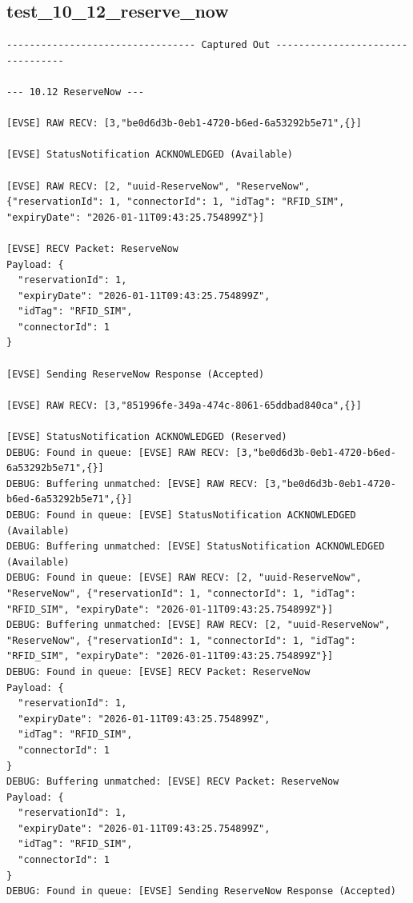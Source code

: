 \documentclass{article}
\begin{document}
\subsection*{test\_10\_12\_reserve\_now}
\begin{lstlisting}
--------------------------------- Captured Out ---------------------------------

--- 10.12 ReserveNow ---

[EVSE] RAW RECV: [3,"be0d6d3b-0eb1-4720-b6ed-6a53292b5e71",{}]

[EVSE] StatusNotification ACKNOWLEDGED (Available)

[EVSE] RAW RECV: [2, "uuid-ReserveNow", "ReserveNow", {"reservationId": 1, "connectorId": 1, "idTag": "RFID_SIM", "expiryDate": "2026-01-11T09:43:25.754899Z"}]

[EVSE] RECV Packet: ReserveNow
Payload: {
  "reservationId": 1,
  "expiryDate": "2026-01-11T09:43:25.754899Z",
  "idTag": "RFID_SIM",
  "connectorId": 1
}

[EVSE] Sending ReserveNow Response (Accepted)

[EVSE] RAW RECV: [3,"851996fe-349a-474c-8061-65ddbad840ca",{}]

[EVSE] StatusNotification ACKNOWLEDGED (Reserved)
DEBUG: Found in queue: [EVSE] RAW RECV: [3,"be0d6d3b-0eb1-4720-b6ed-6a53292b5e71",{}]
DEBUG: Buffering unmatched: [EVSE] RAW RECV: [3,"be0d6d3b-0eb1-4720-b6ed-6a53292b5e71",{}]
DEBUG: Found in queue: [EVSE] StatusNotification ACKNOWLEDGED (Available)
DEBUG: Buffering unmatched: [EVSE] StatusNotification ACKNOWLEDGED (Available)
DEBUG: Found in queue: [EVSE] RAW RECV: [2, "uuid-ReserveNow", "ReserveNow", {"reservationId": 1, "connectorId": 1, "idTag": "RFID_SIM", "expiryDate": "2026-01-11T09:43:25.754899Z"}]
DEBUG: Buffering unmatched: [EVSE] RAW RECV: [2, "uuid-ReserveNow", "ReserveNow", {"reservationId": 1, "connectorId": 1, "idTag": "RFID_SIM", "expiryDate": "2026-01-11T09:43:25.754899Z"}]
DEBUG: Found in queue: [EVSE] RECV Packet: ReserveNow
Payload: {
  "reservationId": 1,
  "expiryDate": "2026-01-11T09:43:25.754899Z",
  "idTag": "RFID_SIM",
  "connectorId": 1
}
DEBUG: Buffering unmatched: [EVSE] RECV Packet: ReserveNow
Payload: {
  "reservationId": 1,
  "expiryDate": "2026-01-11T09:43:25.754899Z",
  "idTag": "RFID_SIM",
  "connectorId": 1
}
DEBUG: Found in queue: [EVSE] Sending ReserveNow Response (Accepted)
\end{lstlisting}
\end{document}
